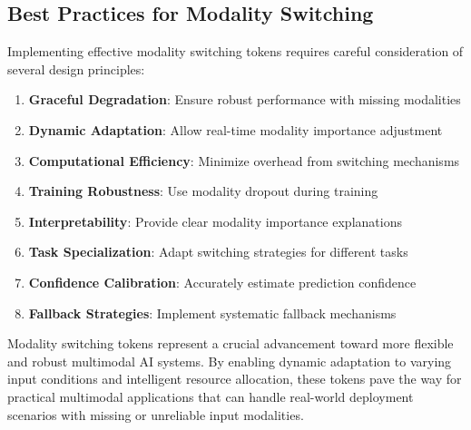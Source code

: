 \subsection{Best Practices for Modality Switching}

Implementing effective modality switching tokens requires careful consideration of several design principles:

\begin{enumerate}
\item \textbf{Graceful Degradation}: Ensure robust performance with missing modalities
\item \textbf{Dynamic Adaptation}: Allow real-time modality importance adjustment
\item \textbf{Computational Efficiency}: Minimize overhead from switching mechanisms
\item \textbf{Training Robustness}: Use modality dropout during training
\item \textbf{Interpretability}: Provide clear modality importance explanations
\item \textbf{Task Specialization}: Adapt switching strategies for different tasks
\item \textbf{Confidence Calibration}: Accurately estimate prediction confidence
\item \textbf{Fallback Strategies}: Implement systematic fallback mechanisms
\end{enumerate}
\begin{comment}
Feedback: This is a good list. To make it more actionable:
1.  **Graceful Degradation**: "When evaluating your model, don't just test it with all modalities present. Create specific test sets with one or more modalities missing to explicitly measure how gracefully the performance degrades. This is a key indicator of a well-trained switching mechanism."
2.  **Training Robustness**: "Start with a modality dropout probability of around 0.3-0.5. If the model still seems to rely too heavily on one modality, you can increase the dropout rate for that specific modality."
3.  **Interpretability**: "During inference, log the modality importance weights that the switching token produces. This can provide valuable insights into your model's decision-making process and help you debug unexpected predictions."
\end{comment}

Modality switching tokens represent a crucial advancement toward more flexible and robust multimodal AI systems. By enabling dynamic adaptation to varying input conditions and intelligent resource allocation, these tokens pave the way for practical multimodal applications that can handle real-world deployment scenarios with missing or unreliable input modalities.

